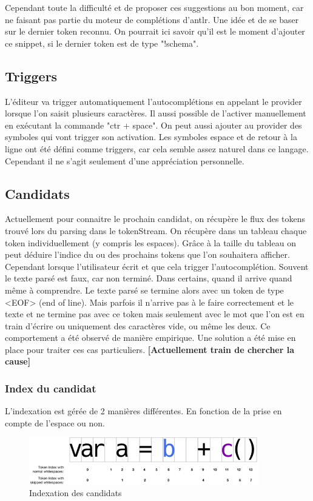 \documentclass[
    iict, %
    il, %
]{heig-tb}
\begin{document}
Cependant toute la difficulté et de proposer ces suggestions au bon moment, car ne faisant pas partie du moteur de complétions d'antlr. Une idée et de se baser sur le dernier token reconnu. On pourrait ici savoir qu'il est le moment d'ajouter ce snippet, si le dernier token est de type "!schema".

\subsection{Triggers}
L'éditeur va trigger automatiquement l'autocomplétions en appelant le provider lorsque l'on saisit plusieurs caractères. Il aussi possible de l'activer manuellement en exécutant la commande "ctr + space".
On peut aussi ajouter au provider des symboles qui vont trigger son activation. Les symboles espace et de retour à la ligne ont été défini comme triggers, car cela semble assez naturel dans ce langage. Cependant il ne s'agit seulement d'une appréciation personnelle.

\subsection{Candidats}
Actuellement pour connaitre le prochain candidat, on récupère le flux des tokens trouvé lors du parsing dans le tokenStream. On récupère dans un tableau chaque token individuellement (y compris les espaces).  Grâce à la taille du tableau on peut déduire l'indice du ou des prochains tokens que l'on souhaitera afficher.
Cependant lorsque l'utilisateur écrit et que cela trigger l'autocomplétion. Souvent le texte parsé est faux, car non terminé. Dans certains, quand il arrive quand même à comprendre. Le texte parsé se termine alors avec un token de type <EOF> (end of line).
Mais parfois il n'arrive pas à le faire correctement et le texte et ne termine pas avec ce token mais seulement avec le mot que l'on est en train d'écrire ou uniquement des caractères vide, ou même les deux.
Ce comportement a été observé de manière empirique. Une solution a été mise en place pour traiter ces cas particuliers.
\textbf{[Actuellement train de chercher la cause]}

\subsubsection{Index du candidat}
L'indexation est gérée de 2 manières différentes. En fonction de la prise en compte de l'espace ou non.

\begin{figure}[!ht]
    \begin{center}
        \includegraphics[width=10cm]{assets/figures/candidat-index.png}
    \end{center}
    \caption[Indexation des candidats]{\label{candidat-index} Indexation des candidats}
\end{figure}
\end{document}
